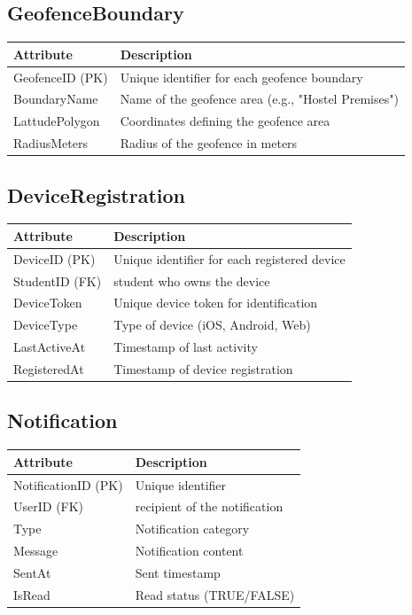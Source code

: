 \documentclass[12pt,a4paper]{article}
\begin{document}
\subsection{GeofenceBoundary}
\begin{longtable}{|p{4cm}|p{8cm}|}
\hline
\textbf{Attribute} & \textbf{Description} \\
\hline
GeofenceID (PK) & Unique identifier for each geofence boundary \\
BoundaryName & Name of the geofence area (e.g., "Hostel Premises") \\
LattudePolygon & Coordinates defining the geofence area \\
RadiusMeters & Radius of the geofence in meters \\
\hline
\end{longtable}

\subsection{DeviceRegistration}
\begin{longtable}{|p{4cm}|p{8cm}|}
\hline
\textbf{Attribute} & \textbf{Description} \\
\hline
DeviceID (PK) & Unique identifier for each registered device \\
StudentID (FK) & student who owns the device \\
DeviceToken & Unique device token for identification \\
DeviceType & Type of device (iOS, Android, Web) \\
LastActiveAt & Timestamp of last activity \\
RegisteredAt & Timestamp of device registration \\
\hline
\end{longtable}

\subsection{Notification}
\begin{longtable}{|p{4cm}|p{8cm}|}
\hline
\textbf{Attribute} & \textbf{Description} \\
\hline
NotificationID (PK) & Unique identifier \\
UserID (FK) & recipient of the notification \\
Type & Notification category \\
Message & Notification content \\
SentAt & Sent timestamp \\
IsRead & Read status (TRUE/FALSE) \\
\hline
\end{longtable}
\end{document}
